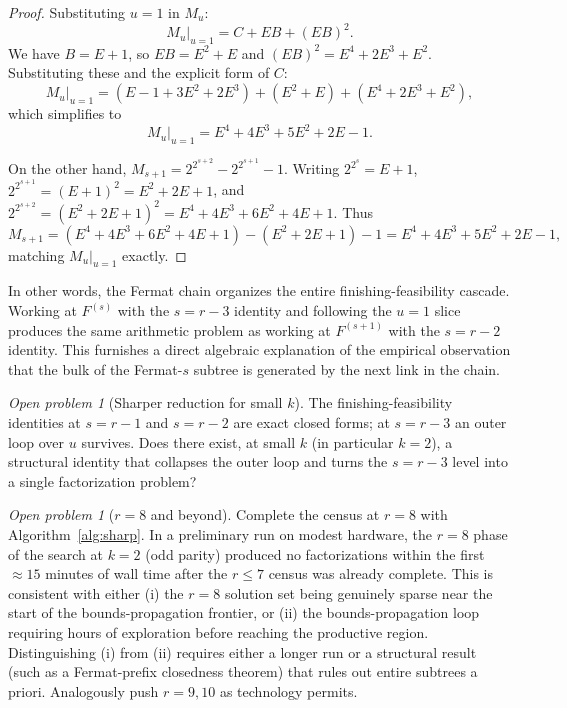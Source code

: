 \documentclass[11pt]{article}
\theoremstyle{definition}
\theoremstyle{remark}
\newtheorem{openproblem}[theorem]{Open problem}
\begin{document}
\begin{proof}
Substituting $u = 1$ in $M_u$:
\[
  M_u\big|_{u=1} = C + EB + (EB)^2.
\]
We have $B = E + 1$, so $EB = E^2 + E$ and
$(EB)^2 = E^4 + 2 E^3 + E^2$.  Substituting these and the explicit
form of $C$:
\[
  M_u\big|_{u=1} = (E - 1 + 3E^2 + 2E^3) + (E^2 + E) + (E^4 + 2E^3 + E^2),
\]
which simplifies to
\[
  M_u\big|_{u=1} = E^4 + 4 E^3 + 5 E^2 + 2 E - 1.
\]

On the other hand, $M_{s+1} = 2^{2^{s+2}} - 2^{2^{s+1}} - 1$.  Writing
$2^{2^s} = E + 1$, $2^{2^{s+1}} = (E+1)^2 = E^2 + 2E + 1$, and
$2^{2^{s+2}} = (E^2 + 2E + 1)^2 = E^4 + 4E^3 + 6E^2 + 4E + 1$.  Thus
\[
  M_{s+1} = (E^4 + 4E^3 + 6E^2 + 4E + 1) - (E^2 + 2E + 1) - 1
         = E^4 + 4E^3 + 5E^2 + 2E - 1,
\]
matching $M_u\big|_{u=1}$ exactly.
\end{proof}

In other words, the Fermat chain organizes the entire
finishing-feasibility cascade.  Working at $F^{(s)}$ with the $s = r
- 3$ identity and following the $u = 1$ slice produces the same
arithmetic problem as working at $F^{(s+1)}$ with the $s = r - 2$
identity.  This furnishes a direct algebraic explanation of the
empirical observation that the bulk of the Fermat-$s$ subtree is
generated by the next link in the chain.

\begin{openproblem}[Sharper reduction for small $k$]
The finishing-feasibility identities at $s = r - 1$ and $s = r - 2$
are exact closed forms; at $s = r - 3$ an outer loop over $u$
survives. Does there exist, at small $k$ (in particular $k = 2$), a
structural identity that collapses the outer loop and turns the
$s = r - 3$ level into a single factorization problem?
\end{openproblem}

\begin{openproblem}[$r = 8$ and beyond]
Complete the census at $r = 8$ with Algorithm~\ref{alg:sharp}. In a
preliminary run on modest hardware, the $r = 8$ phase of the search
at $k = 2$ (odd parity) produced no factorizations within the first
$\approx 15$ minutes of wall time after the $r \le 7$ census was
already complete. This is consistent with either (i) the $r = 8$
solution set being genuinely sparse near the start of the
bounds-propagation frontier, or (ii) the bounds-propagation loop
requiring hours of exploration before reaching the productive
region. Distinguishing (i) from (ii) requires either a longer run
or a structural result (such as a Fermat-prefix closedness theorem)
that rules out entire subtrees a priori. Analogously push $r = 9,
10$ as technology permits.
\end{openproblem}
\end{document}
